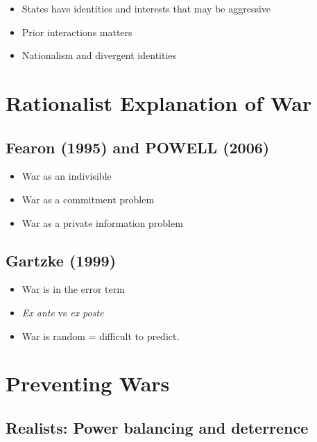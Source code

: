 \documentclass[
]{book}
\begin{document}
\begin{itemize}
\item
  States have identities and interests that may be
  aggressive
\item
  Prior interactions matters
\item
  Nationalism and divergent identities
\end{itemize}

\hypertarget{rationalist-explanation-of-war}{%
\section{Rationalist Explanation of War}\label{rationalist-explanation-of-war}}

\hypertarget{fearon-1995-and-powell-2006}{%
\subsection{Fearon (1995) and POWELL (2006)}\label{fearon-1995-and-powell-2006}}

\begin{itemize}
\item
  War as an indivisible
\item
  War as a commitment problem
\item
  War as a private information problem
\end{itemize}

\hypertarget{gartzke-1999}{%
\subsection{Gartzke (1999)}\label{gartzke-1999}}

\begin{itemize}
\item
  War is in the error term
\item
  \emph{Ex ante} vs \emph{ex poste}
\item
  War is random = difficult to predict.
\end{itemize}

\hypertarget{preventing-wars}{%
\section{Preventing Wars}\label{preventing-wars}}

\hypertarget{realists-power-balancing-and-deterrence}{%
\subsection{Realists: Power balancing and deterrence}\label{realists-power-balancing-and-deterrence}}
\end{document}

